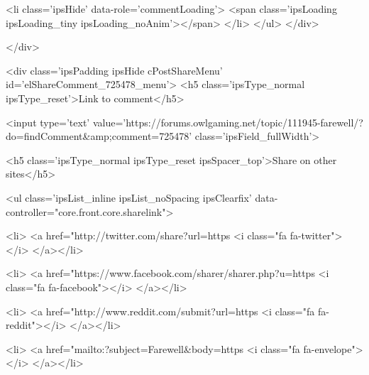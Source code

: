 						
						
					
					<li class='ipsHide' data-role='commentLoading'>
						<span class='ipsLoading ipsLoading_tiny ipsLoading_noAnim'></span>
					</li>
				</ul>
			</div>
		

		
	</div>

	

	



<div class='ipsPadding ipsHide cPostShareMenu' id='elShareComment_725478_menu'>
	<h5 class='ipsType_normal ipsType_reset'>Link to comment</h5>
	
		
	
	
	<input type='text' value='https://forums.owlgaming.net/topic/111945-farewell/?do=findComment&amp;comment=725478' class='ipsField_fullWidth'>

	
	<h5 class='ipsType_normal ipsType_reset ipsSpacer_top'>Share on other sites</h5>
	

	<ul class='ipsList_inline ipsList_noSpacing ipsClearfix' data-controller="core.front.core.sharelink">
		
			<li>
<a href="http://twitter.com/share?url=https%
	<i class="fa fa-twitter"></i>
</a></li>
		
			<li>
<a href="https://www.facebook.com/sharer/sharer.php?u=https%
	<i class="fa fa-facebook"></i>
</a></li>
		
			<li>
<a href="http://www.reddit.com/submit?url=https%
	<i class="fa fa-reddit"></i>
</a></li>
		
			<li>
<a href="mailto:?subject=Farewell&body=https%
	<i class="fa fa-envelope"></i>
</a></li>
		
